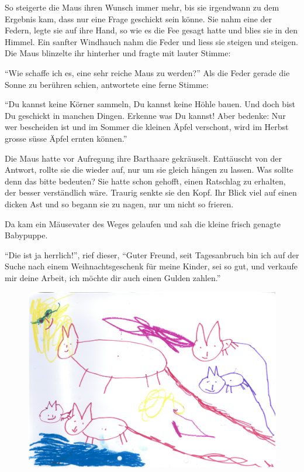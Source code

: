 So steigerte die Maus ihren Wunsch immer mehr, bis sie irgendwann zu dem Ergebnis kam, dass nur eine Frage geschickt sein könne. Sie nahm eine der Federn, legte sie auf ihre Hand, so wie es die Fee gesagt hatte und blies sie in den Himmel. Ein sanfter Windhauch nahm die Feder und liess sie steigen und steigen. Die Maus blinzelte ihr hinterher und fragte mit lauter Stimme: 

\enquote{Wie schaffe ich es, eine sehr reiche Maus zu werden?} Als die Feder gerade die Sonne zu berühren schien, antwortete eine ferne Stimme:

\enquote{Du kannst keine Körner sammeln, Du kannst keine Höhle bauen. Und doch bist Du geschickt in manchen Dingen. Erkenne was Du kannst! Aber bedenke: Nur wer bescheiden ist und im Sommer die kleinen Äpfel verschont, wird im Herbst grosse süsse Äpfel ernten können.} 

Die Maus hatte vor Aufregung ihre Barthaare gekräuselt. Enttäuscht von der Antwort, rollte sie die wieder auf, nur um sie gleich hängen zu lassen. Was sollte denn das bitte bedeuten? Sie hatte schon gehofft, einen Ratschlag zu erhalten, der besser verständlich wäre. Traurig senkte sie den Kopf. Ihr Blick viel auf einen dicken Ast und so begann sie zu nagen, nur um nicht so frieren. 

Da kam ein Mäusevater des Weges gelaufen und sah die kleine frisch genagte Babypuppe. 

\enquote{Die ist ja herrlich!}, rief dieser, \enquote{Guter Freund, seit Tagesanbruch bin ich auf der Suche nach einem Weihnachtsgeschenk für meine Kinder, sei so gut, und verkaufe mir deine Arbeit, ich möchte dir auch einen Gulden zahlen.}

\begin{figure}[hb]
\centering
\includegraphics[width=.8\textwidth]{bilder/maus.pdf}
\end{figure}


